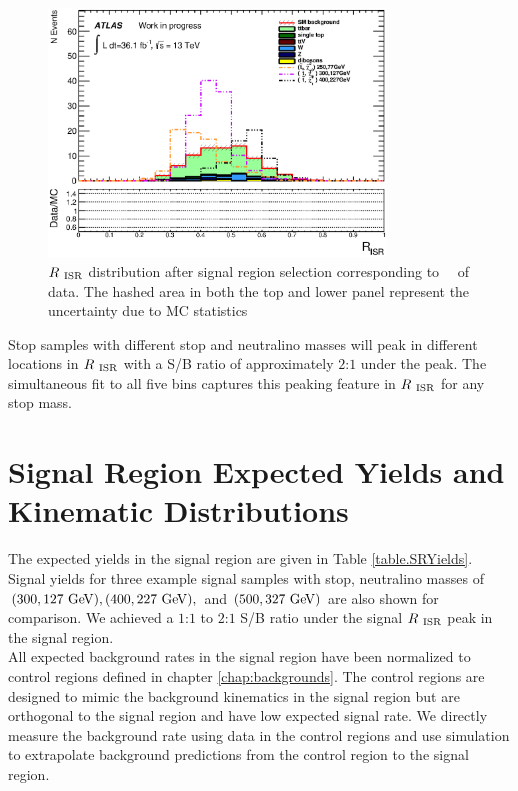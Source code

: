 \begin{figure}[h!]
  \begin{center}
     \includegraphics[width=0.80\textwidth]{figures/plotSR/SR_ND1_RISR_7SR.eps}
  \caption[$\RISR$ distribution after signal region selection corresponding to \intlumi\ \ifb\ of data]{ $\RISR$ distribution after signal region selection corresponding to \intlumi\ \ifb\ of data. The hashed area in both the top and lower panel represent the uncertainty due to MC statistics}
  \label{fig:SR:RISR1}
  \end{center}
\end{figure}

\indent Stop samples with different stop and neutralino masses will peak in different locations in $\RISR$ with a S/B ratio of approximately $2$:$1$ under the peak.  The simultaneous fit to all five bins captures this peaking feature in $\RISR$ for any stop mass.  \\

\section{Signal Region Expected Yields and Kinematic Distributions}
\label{sec:SR:Yields}

\indent The expected yields in the signal region are given in Table \ref{table.SRYields}.  Signal yields for three example signal samples with stop, neutralino masses of $(300,127 \gev), (400,227\gev), $ and $(500,327 \gev)$ are also shown for comparison.  We achieved a $1$:$1$ to $2$:$1$ S/B ratio under the signal $\RISR$ peak in the signal region. \\

\indent All expected background rates in the signal region have been normalized to control regions defined in chapter \ref{chap:backgrounds}.  The control regions are designed to mimic the background kinematics in the signal region but are orthogonal to the signal region and have low expected signal rate.  We directly measure the background rate using data in the control regions and use simulation to extrapolate background predictions from the control region to the signal region. \\

